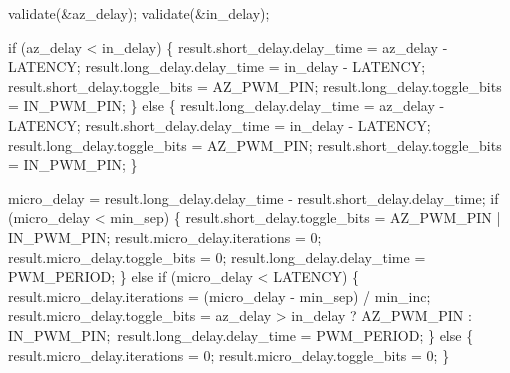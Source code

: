\documentclass[]{report}
\begin{document}
	validate(\&az\_delay);\newline
	validate(\&in\_delay);\newline
	
	if (az\_delay < in\_delay)\newline
	\{\newline
		result.short\_delay.delay\_time = az\_delay - LATENCY;\newline
		result.long\_delay.delay\_time = in\_delay - LATENCY;\newline
		result.short\_delay.toggle\_bits = AZ\_PWM\_PIN;\newline
		result.long\_delay.toggle\_bits = IN\_PWM\_PIN;\newline
	\}\newline
	else\newline
	\{\newline
		result.long\_delay.delay\_time = az\_delay - LATENCY;\newline
		result.short\_delay.delay\_time = in\_delay - LATENCY;\newline
		result.long\_delay.toggle\_bits = AZ\_PWM\_PIN;\newline
		result.short\_delay.toggle\_bits = IN\_PWM\_PIN;\newline
	\}\newline
	
	micro\_delay = result.long\_delay.delay\_time - result.short\_delay.delay\_time;\newline
	if (micro\_delay < min\_sep)\newline
	\{\newline
		result.short\_delay.toggle\_bits = AZ\_PWM\_PIN | IN\_PWM\_PIN;\newline
		result.micro\_delay.iterations = 0;\newline
		result.micro\_delay.toggle\_bits = 0;\newline
		result.long\_delay.delay\_time = PWM\_PERIOD;\newline
	\}\newline
	else if (micro\_delay < LATENCY)\newline
	\{\newline
		result.micro\_delay.iterations = (micro\_delay - min\_sep) / min\_inc;\newline
		result.micro\_delay.toggle\_bits = az\_delay > in\_delay ? AZ\_PWM\_PIN : IN\_PWM\_PIN;\newline\
		result.long\_delay.delay\_time = PWM\_PERIOD;\newline
	\}\newline
	else\newline
	\{\newline
		result.micro\_delay.iterations = 0;\newline
		result.micro\_delay.toggle\_bits = 0;\newline
	\}\newline
	
\end{document}
